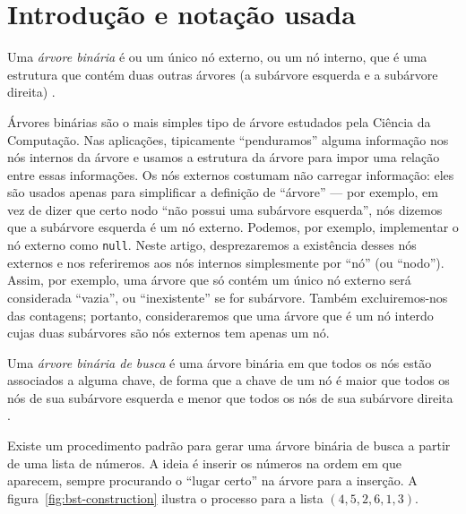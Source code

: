 \section{Introdução e notação usada}

\begin{definition}
    Uma \emph{árvore binária}
    é ou um único nó externo,
    ou um nó interno,
    que é uma estrutura que contém duas outras árvores
    (a subárvore esquerda e a subárvore direita)
    \cite[p.~257]{SedgewickFlajolet2013}.
\end{definition}

Árvores binárias são o mais simples tipo de árvore
estudados pela Ciência da Computação.
Nas aplicações,
tipicamente ``penduramos'' alguma informação nos nós internos da árvore
e usamos a estrutura da árvore para impor uma relação entre essas informações.
Os nós externos costumam não carregar informação:
eles são usados apenas para simplificar a definição de ``árvore''
--- por exemplo,
em vez de dizer que certo nodo ``não possui uma subárvore esquerda'',
nós dizemos que a subárvore esquerda é um nó externo.
Podemos, por exemplo,
implementar o nó externo como \texttt{null}.
Neste artigo,
desprezaremos a existência desses nós externos
e nos referiremos aos nós internos simplesmente por ``nó'' (ou ``nodo'').
Assim, por exemplo,
uma árvore que só contém um único nó externo
será considerada ``vazia'', ou ``inexistente'' se for subárvore.
Também excluiremos-nos das contagens;
portanto, consideraremos que
uma árvore que é um nó interdo cujas duas subárvores são nós externos
tem apenas um nó.

\begin{definition}
    Uma \emph{árvore binária de busca}
    é uma árvore binária em que
    todos os nós estão associados a alguma chave,
    de forma que a chave de um nó
    é maior que todos os nós de sua subárvore esquerda
    e menor que todos os nós de sua subárvore direita
    \cite[p.~282]{SedgewickFlajolet2013}.
\end{definition}

Existe um procedimento padrão para gerar uma árvore binária de busca
a partir de uma lista de números.
A ideia é inserir os números na ordem em que aparecem,
sempre procurando o ``lugar certo'' na árvore para a inserção.
A figura~\ref{fig:bst-construction} ilustra o processo para a lista $(4, 5, 2, 6, 1, 3)$.

